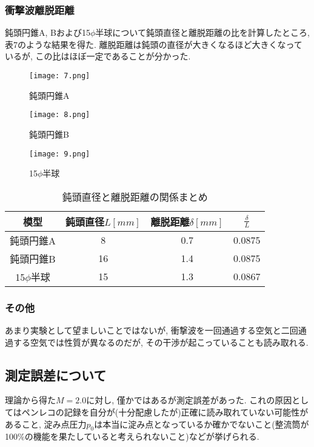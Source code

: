 \documentclass[12pt]{jsarticle}
\begin{document}
\subsubsection{衝撃波離脱距離}
鈍頭円錐A, Bおよび15$\phi$半球について鈍頭直径と離脱距離の比を計算したところ, 表7のような結果を得た. 離脱距離は鈍頭の直径が大きくなるほど大きくなっているが, この比はほぼ一定であることが分かった.
\begin{figure}[htbp]
 \begin{minipage}{0.5\hsize}
  \begin{center}
   \texttt{[image: 7.png]}
  \end{center}
  \caption{鈍頭円錐A}
 \end{minipage}
 \begin{minipage}{0.5\hsize}
  \begin{center}
   \texttt{[image: 8.png]}
  \end{center}
  \caption{鈍頭円錐B}
 \end{minipage}
\end{figure}
\begin{figure}[htbp]
\begin{center}
\texttt{[image: 9.png]}
\caption{15$\phi$半球}
\end{center}
\end{figure}
\begin{table}[htb]
  \begin{center}
    \caption{鈍頭直径と離脱距離の関係まとめ}
    \begin{tabular}{|c|c|c|c|} \hline
      模型 & 鈍頭直径$L[mm]$ & 離脱距離$\delta[mm]$ & $\frac{\delta}{L}$ \\ \hline
      鈍頭円錐A & 8 & 0.7 & 0.0875 \\ \hline
      鈍頭円錐B & 16 & 1.4 & 0.0875 \\ \hline
      15$\phi$半球 & 15 & 1.3 & 0.0867 \\ \hline
    \end{tabular}
  \end{center}
\end{table}

\newpage
\subsubsection{その他}
あまり実験として望ましいことではないが, 衝撃波を一回通過する空気と二回通過する空気では性質が異なるのだが, その干渉が起こっていることも読み取れる.

\subsection{測定誤差について}
理論から得た$M=2.0$に対し, 僅かではあるが測定誤差があった. これの原因としてはペンレコの記録を自分が(十分配慮したが)正確に読み取れていない可能性があること, 淀み点圧力$p_0$は本当に淀み点となっているか確かでないこと(整流筒が100\%の機能を果たしていると考えられないこと)などが挙げられる.
\end{document}
